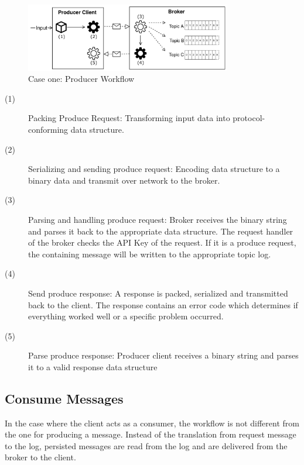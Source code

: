 \begin{figure}[H]
    \centering
    \includegraphics[width=0.8\textwidth]{images/concept_producer.png}
    \caption{Case one: Producer Workflow}
    \label{fig:conept-producer}
\end{figure}

\begin{description}
    \item [(1)] 
        {Packing Produce Request: Transforming input data into protocol-conforming data structure.}
    \item [(2)] 
        {Serializing and sending produce request: Encoding data structure to a
            binary data and transmit over network to the broker.}
    \item [(3)] 
        {Parsing and handling produce request: Broker receives the binary string
            and parses it back to the appropriate data structure. The request
            handler of the  broker checks the API Key of the request. If it is a
            produce request, the containing message will be written to the
            appropriate topic log.}
    \item [(4)] 
        {Send produce response: A response is packed, serialized and transmitted
            back to the client. The response contains an error code which
            determines if everything worked well or a specific problem occurred.
        }
    \item [(5)] 
        {Parse produce response: Producer client receives a binary string and
            parses it to a valid response data structure }
\end{description}

\subsection{Consume Messages}

In the case where the client acts as a consumer, the workflow is not different from the one for
producing a message. Instead of the translation from request message to the log, persisted messages
are read from the log and are delivered from the broker to the client.

